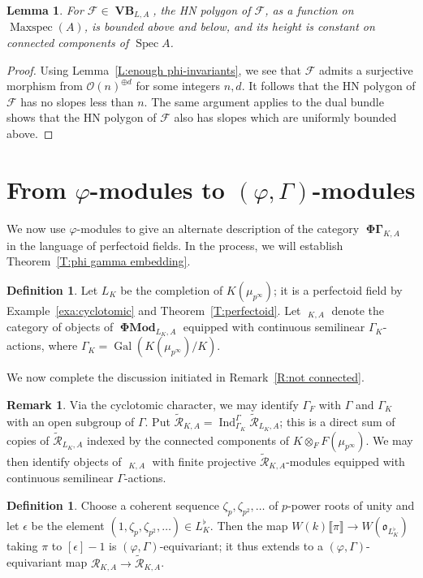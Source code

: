 \documentclass[12pt]{amsart}
\newtheorem{lemma}[theorem]{Lemma}
\theoremstyle{definition}
\newtheorem{defn}[theorem]{Definition}
\newtheorem{remark}[theorem]{Remark}
\numberwithin{equation}{theorem}
\newcommand{\calF}{\mathcal{F}}
\newcommand{\calO}{\mathcal{O}}
\newcommand{\calR}{\mathcal{R}}
\newcommand{\frako}{\mathfrak{o}}
\DeclareMathOperator{\Gal}{Gal}
\DeclareMathOperator{\Ind}{Ind}
\DeclareMathOperator{\Maxspec}{Maxspec}
\DeclareMathOperator{\PhiGamma}{\mathbf{\Phi \Gamma}}
\DeclareMathOperator{\PhiGammatilde}{\widetilde{\mathbf{\Phi \Gamma}}}
\DeclareMathOperator{\PhiMod}{\mathbf{\Phi Mod}}
\DeclareMathOperator{\Spec}{Spec}
\DeclareMathOperator{\VB}{\mathbf{VB}}
\begin{document}
\begin{lemma} \label{L:bounded slopes}
For $\calF \in \VB_{L,A}$, the HN polygon of $\calF$, as a function on $\Maxspec(A)$, is bounded above and below, and its height is constant on connected components of $\Spec A$.
\end{lemma}
\begin{proof}
Using Lemma~\ref{L:enough phi-invariants},
we see that $\calF$ admits a surjective morphism from $\calO(n)^{\oplus d}$ for some integers $n,d$. It follows that the HN polygon of $\calF$ has no slopes less than $n$.
The same argument applies to the dual bundle shows that the HN polygon of $\calF$ also has slopes which are uniformly bounded above.
\end{proof}
 

\section{From \texorpdfstring{$\varphi$}{phi}-modules to \texorpdfstring{$(\varphi, \Gamma)$}{(phi, Gamma)}-modules}
\label{sec:alternate}

We now use $\varphi$-modules to give an alternate description of the category $\PhiGamma_{K,A}$ in the language of perfectoid fields. In the process, we will establish Theorem~\ref{T:phi gamma embedding}.

\begin{defn}
Let $L_K$ be the completion of $K(\mu_{p^\infty})$; it is a perfectoid field by
Example~\ref{exa:cyclotomic} and Theorem~\ref{T:perfectoid}.
Let $\PhiGammatilde_{K,A}$ denote the category of objects of $\PhiMod_{L_K,A}$ equipped with continuous semilinear $\Gamma_K$-actions, where $\Gamma_K = \Gal(K(\mu_{p^\infty})/K)$.
\end{defn}

We now complete the discussion initiated in Remark~\ref{R:not connected}.
\begin{remark} \label{R:not connected2}
Via the cyclotomic character, we may identify $\Gamma_F$ with $\Gamma$ and $\Gamma_K$ with an open subgroup of $\Gamma$. Put $\tilde{\calR}_{K,A} = \Ind_{\Gamma_K}^\Gamma \tilde{\calR}_{L_K,A}$; this is a direct sum of copies of $\tilde{\calR}_{L_K,A}$ indexed by the connected components of $K \otimes_F F(\mu_{p^\infty})$. 
We may then identify objects of $\PhiGammatilde_{K,A}$ with finite projective
$\tilde{\calR}_{K,A}$-modules equipped with continuous semilinear $\Gamma$-actions.
\end{remark}

\begin{defn} \label{D:untilde to tilde map}
Choose a coherent sequence $\zeta_p, \zeta_{p^2}, \dots$ of $p$-power roots of unity
and let $\epsilon$ be the element $(1, \zeta_p, \zeta_{p^2}, \dots) \in L_K^{\flat}$.
Then the map $W(k) \llbracket \pi \rrbracket \to W(\frako_{L^\flat_K})$ taking $\pi$ to $[\epsilon]-1$
is $(\varphi, \Gamma)$-equivariant; it thus extends to a $(\varphi, \Gamma)$-equivariant map $\calR_{K,A} \to \tilde{\calR}_{K,A}$.
\end{defn}
\end{document}
